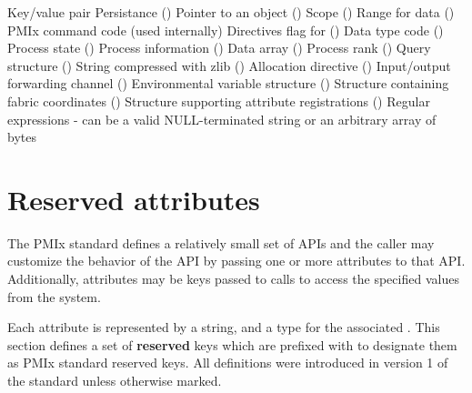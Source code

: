 \begin{constantdesc}
Key/value pair
%
Persistance ()
%
Pointer to an object ()
%
Scope ()
%
Range for data ()
%
PMIx command code (used internally)
%
Directives flag for  ()
%
Data type code ()
%
Process state ()
%
Process information ()
%
Data array ()
%
Process rank ()
%
Query structure ()
%
String compressed with zlib ()
%
Allocation directive ()
%
Input/output forwarding channel ()
%
Environmental variable structure ()
%
Structure containing fabric coordinates ()
%
Structure supporting attribute registrations ()
%
%
Regular expressions - can be a valid NULL-terminated string or an arbitrary array of bytes
%

\end{constantdesc}

\section{Reserved attributes}
\label{api:struct:attributes}

The PMIx standard defines a relatively small set of APIs and the caller may customize the behavior of the API by passing one or more attributes to that API.
Additionally, attributes may be keys passed to  calls to access the specified values from the system.

Each attribute is represented by a  string, and a type for the associated .
This section defines a set of \textbf{reserved} keys which are prefixed with  to designate them as PMIx standard reserved keys. All definitions were introduced in version 1 of the standard unless otherwise marked.

